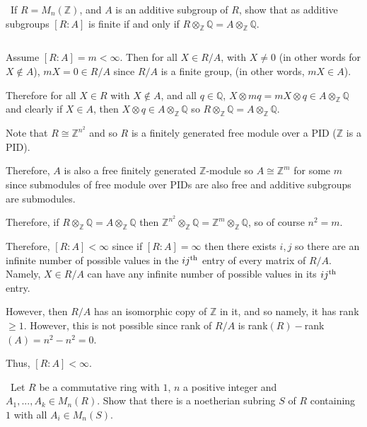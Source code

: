 \documentclass[12pt]{Qual}
\begin{document}
\begin{problem} $\,$
If $R=M_n(\mathbb{Z})$, and $A$ is an additive subgroup of $R$, show that as additive subgroups $[R:A]$ is finite if and only if $R\otimes_\mathbb{Z}\mathbb{Q}=A\otimes_\mathbb{Z}\mathbb{Q}.$
\end{problem}


\begin{solution}$\,$

\boxed{\implies} Assume $[R:A]=m<\infty$. Then for all $X\in R/A$, with $X\not=0$ (in other words for $X\notin A$), $mX=0\in R/A$ since $R/A$ is a finite group, (in other words, $mX\in A$).

Therefore for all $X\in R$ with $X\notin A$, and all $q\in\mathbb{Q}$, $X\otimes mq=mX\otimes q\in A\otimes_\mathbb{Z}\mathbb{Q}$ and clearly if $X\in A$, then $X\otimes q\in A\otimes_\mathbb{Z}\mathbb{Q}$ so $R\otimes_\mathbb{Z}\mathbb{Q}=A\otimes_\mathbb{Z}\mathbb{Q}$.

\boxed{\impliedby} Note that $R\cong\mathbb{Z}^{n^2}$ and so $R$ is a finitely generated free module over a PID ($\mathbb{Z}$ is a PID).

Therefore, $A$ is also a free finitely generated $\mathbb{Z}$-module so $A\cong\mathbb{Z}^m$ for some $m$ since submodules of free module over PIDs are also free and additive subgroups are submodules.

Therefore, if $R\otimes_\mathbb{Z}\mathbb{Q}=A\otimes_\mathbb{Z}\mathbb{Q}$ then $\mathbb{Z}^{n^2}\otimes_\mathbb{Z}\mathbb{Q}=\mathbb{Z}^m\otimes_\mathbb{Z}\mathbb{Q}$, so of course $n^2=m$.

Therefore, $[R:A]<\infty$ since if $[R:A]=\infty$ then there exists $i,j$ so there are an infinite number of possible values in the $ij^\text{th}$ entry of every matrix of $R/A$. Namely, $X\in R/A$ can have any infinite number of possible values in its $ij^\text{th}$ entry.

However, then $R/A$ has an isomorphic copy of $\mathbb{Z}$ in it, and so namely, it has rank $\ge1$. However, this is not possible since rank of $R/A$ is rank$(R)-$rank$(A)=n^2-n^2=0$.

Thus, $[R:A]<\infty.$
\end{solution}
\newpage


\begin{problem} $\,$
Let $R$ be a commutative ring with $1$, $n$ a positive integer and $A_1,...,A_k\in M_n(R)$. Show that there is a noetherian subring $S$ of $R$ containing $1$ with all $A_i\in M_n(S).$
\end{problem}
\end{document}

